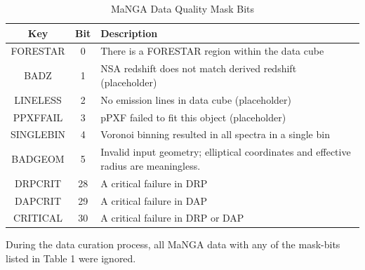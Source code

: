 \begin{table}[h!]
\centering
\begin{tabular}{|c|c|l|} 
 \hline
 Key & Bit & Description \\ [0.5ex] 
 \hline
 FORESTAR & 0 & There is a FORESTAR region within the data cube \\ 
 \hline
 BADZ & 1 & NSA redshift does not match derived redshift (placeholder) \\
 \hline
 LINELESS & 2 & No emission lines in data cube (placeholder) \\
 \hline
 PPXFFAIL & 3 & pPXF failed to fit this object (placeholder) \\
 \hline
 SINGLEBIN & 4 & Voronoi binning resulted in all spectra in a single bin \\
 \hline
 BADGEOM & 5 & Invalid input geometry; elliptical coordinates and effective radius are meaningless. \\
 \hline
 DRPCRIT & 28 & A critical failure in DRP \\
 \hline
 DAPCRIT & 29 & A critical failure in DAP \\ 
 \hline
 CRITICAL & 30 & A critical failure in DRP or DAP \\ [1ex] 
 \hline
\end{tabular}
\caption{MaNGA Data Quality Mask Bits}
\label{table:MaNGA Data Quality Mask Bits}
\end{table}

During the data curation process, all MaNGA data with any of the mask-bits listed in Table 1 were ignored.
